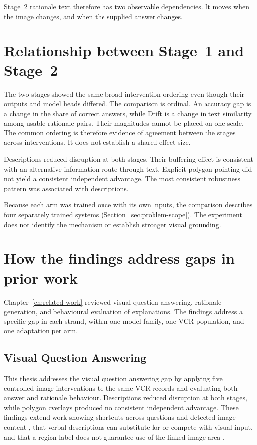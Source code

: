 Stage~2 rationale text therefore has two observable dependencies. It moves when
the image changes, and when the supplied answer changes.

\section{Relationship between Stage~1 and Stage~2}
\label{sec:discussion-stages}

The two stages showed the same broad intervention ordering even though their
outputs and model heads differed. The comparison is ordinal. An accuracy gap is
a change in the share of correct answers, while Drift is a change in text
similarity among usable rationale pairs. Their magnitudes cannot be placed on
one scale. The common ordering is therefore evidence of agreement between the
stages across interventions. It does
not establish a shared effect size.

Descriptions reduced disruption at both stages. Their buffering effect is
consistent with an alternative information route through text.
Explicit polygon pointing did not yield a consistent independent advantage.
The most consistent robustness pattern was associated with descriptions.

Because each arm was trained once with its own inputs, the comparison describes four
separately trained systems (Section~\ref{sec:problem-scope}). The experiment does
not identify the mechanism or establish stronger visual grounding.

\section{How the findings address gaps in prior work}
\label{sec:discussion-priorwork}

Chapter~\ref{ch:related-work} reviewed visual question answering, rationale
generation, and behavioural evaluation of explanations. The findings address a
specific gap in each strand, within one model family, one VCR population, and
one adaptation per arm.

\subsection{Visual Question Answering}
\label{sec:discussion-priorwork-vqa}

This thesis addresses the visual question answering gap by applying five
controlled image interventions to the same VCR records and evaluating both
answer and rationale behaviour. Descriptions reduced disruption at both stages,
while polygon overlays produced no consistent independent advantage. These
findings extend work showing shortcuts across questions and detected image
content
\citep{DBLP:conf/iccv/DancetteCTC21,DBLP:conf/emnlp/SiMZLL0CWZ22},
that verbal descriptions can substitute for or compete with visual input, and
that a region label does not guarantee use of the linked image area
\citep{HakimovS23,DBLP:conf/cvpr/DengCCH25,LiGWCNK24}.

